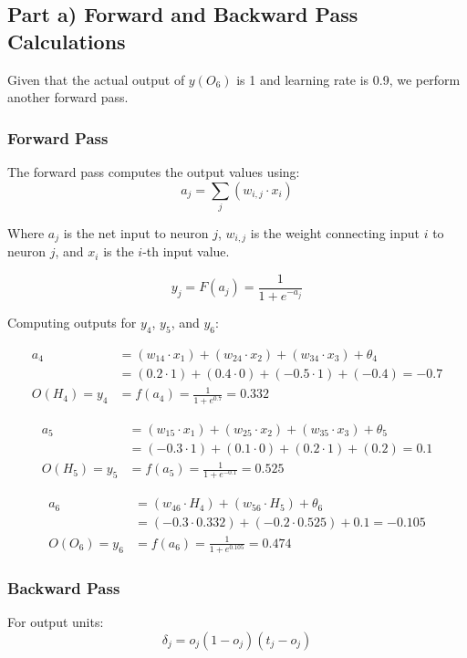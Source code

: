 \documentclass{exam}
\begin{document}
\subsection*{Part a) Forward and Backward Pass Calculations}

Given that the actual output of $y(O_6)$ is 1 and learning rate is 0.9, we perform another forward pass.

\subsubsection*{Forward Pass}
The forward pass computes the output values using:
\begin{equation}
a_j = \sum_j (w_{i,j} \cdot x_i)
\end{equation}

Where $a_j$ is the net input to neuron $j$, $w_{i,j}$ is the weight connecting input $i$ to neuron $j$, and $x_i$ is the $i$-th input value.

\begin{equation}
y_j = F(a_j) = \frac{1}{1 + e^{-a_j}}
\end{equation}

Computing outputs for $y_4$, $y_5$, and $y_6$:

\begin{align*}
a_4 &= (w_{14} \cdot x_1) + (w_{24} \cdot x_2) + (w_{34} \cdot x_3) + \theta_4 \\
&= (0.2 \cdot 1) + (0.4 \cdot 0) + (-0.5 \cdot 1) + (-0.4) = -0.7 \\
O(H_4) = y_4 &= f(a_4) = \frac{1}{1 + e^{0.7}} = 0.332
\end{align*}

\begin{align*}
a_5 &= (w_{15} \cdot x_1) + (w_{25} \cdot x_2) + (w_{35} \cdot x_3) + \theta_5 \\
&= (-0.3 \cdot 1) + (0.1 \cdot 0) + (0.2 \cdot 1) + (0.2) = 0.1 \\
O(H_5) = y_5 &= f(a_5) = \frac{1}{1 + e^{-0.1}} = 0.525
\end{align*}

\begin{align*}
a_6 &= (w_{46} \cdot H_4) + (w_{56} \cdot H_5) + \theta_6 \\
&= (-0.3 \cdot 0.332) + (-0.2 \cdot 0.525) + 0.1 = -0.105 \\
O(O_6) = y_6 &= f(a_6) = \frac{1}{1 + e^{0.105}} = 0.474
\end{align*}

\subsubsection*{Backward Pass}
For output units:
\begin{equation}
\delta_j = o_j(1 - o_j)(t_j - o_j)
\end{equation}
\end{document}
